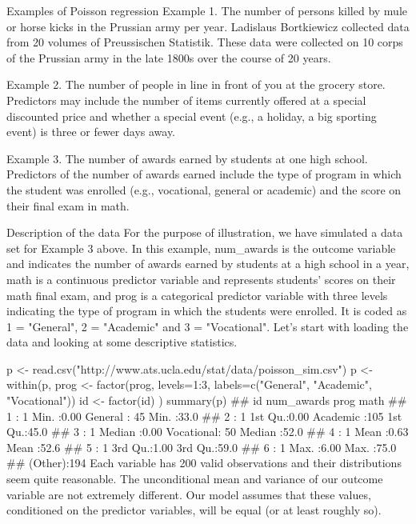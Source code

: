 Examples of Poisson regression
Example 1. The number of persons killed by mule or horse kicks in the Prussian army per year. Ladislaus Bortkiewicz collected data from 20 volumes of Preussischen Statistik. These data were collected on 10 corps of the Prussian army in the late 1800s over the course of 20 years.

Example 2. The number of people in line in front of you at the grocery store. Predictors may include the number of items currently offered at a special discounted price and whether a special event (e.g., a holiday, a big sporting event) is three or fewer days away.

Example 3. The number of awards earned by students at one high school. Predictors of the number of awards earned include the type of program in which the student was enrolled (e.g., vocational, general or academic) and the score on their final exam in math.

Description of the data
For the purpose of illustration, we have simulated a data set for Example 3 above. In this example, num_awards is the outcome variable and indicates the number of awards earned by students at a high school in a year, math is a continuous predictor variable and represents students' scores on their math final exam, and prog is a categorical predictor variable with three levels indicating the type of program in which the students were enrolled. It is coded as 1 = "General", 2 = "Academic" and 3 = "Vocational". Let's start with loading the data and looking at some descriptive statistics.

p <- read.csv("http://www.ats.ucla.edu/stat/data/poisson_sim.csv")
p <- within(p, {
  prog <- factor(prog, levels=1:3, labels=c("General", "Academic", "Vocational"))
  id <- factor(id)
})
summary(p)
##        id        num_awards           prog          math     
##  1      :  1   Min.   :0.00   General   : 45   Min.   :33.0  
##  2      :  1   1st Qu.:0.00   Academic  :105   1st Qu.:45.0  
##  3      :  1   Median :0.00   Vocational: 50   Median :52.0  
##  4      :  1   Mean   :0.63                    Mean   :52.6  
##  5      :  1   3rd Qu.:1.00                    3rd Qu.:59.0  
##  6      :  1   Max.   :6.00                    Max.   :75.0  
##  (Other):194
Each variable has 200 valid observations and their distributions seem quite reasonable. The unconditional mean and variance of our outcome variable are not extremely different. Our model assumes that these values, conditioned on the predictor variables, will be equal (or at least roughly so).

